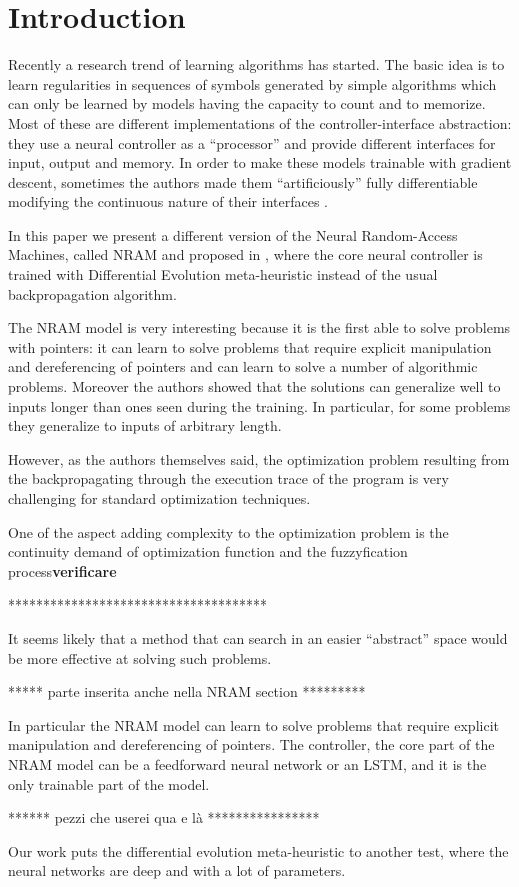 \section{Introduction}

Recently a research trend of learning algorithms \cite{Graves2014NeuralTM,Joulin2015InferringAP,others} has started. The basic idea is to learn regularities in sequences of symbols generated by simple algorithms which can only be learned by models having the capacity to count and to memorize.
Most of these are different implementations of the controller-interface abstraction: they use a neural controller as a ``processor'' and provide different interfaces for input, output and memory. In order to make these models trainable with gradient descent, sometimes the authors made them ``artificiously'' fully differentiable modifying the continuous nature of their interfaces \cite{Graves2014NeuralTM,NRAM:2016}.

In this paper we present a different version of the Neural Random-Access Machines, called NRAM and proposed in \cite{NRAM:2016}, where the core neural controller is trained with Differential Evolution meta-heuristic instead of the usual backpropagation algorithm.

The NRAM model is very interesting because it is the first able to solve problems with pointers:
it can learn to solve problems
that require explicit manipulation and dereferencing of pointers and can learn to solve a number of algorithmic problems. Moreover the authors showed that the solutions can generalize well
to inputs longer than ones seen during the training. In particular, for some problems they generalize
to inputs of arbitrary length.

However, as the authors themselves said, the optimization problem resulting from the backpropagating through the
execution trace of the program is very challenging for standard optimization techniques.  

One of the aspect adding complexity to the optimization problem is the continuity demand of optimization function and the fuzzyfication process{\bf verificare}


*************************************

It seems
likely that a method that can search in an easier “abstract” space would be more effective at solving
such problems.

***** parte inserita anche nella NRAM section *********



In particular the NRAM model can learn to solve problems that require explicit manipulation and dereferencing of pointers. 
 The controller, the core part of the NRAM model can be a feedforward neural network or an LSTM, and it is the only
trainable part of the model.

****** pezzi che userei qua e l\`a ****************

 Our work puts the differential evolution meta-heuristic to another test, where the neural networks are deep and with a lot of parameters.

